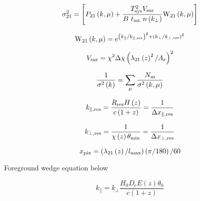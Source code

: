 \lipsum[1-1]

\begin{equation}
\sigma_{21}^2 = \left[ P_{21}\left(k, \mu \right) + \frac{T^2_{\rm sys} V_{\rm sur}}{B \ t_{\rm int} \ n \left(k_{\perp}\right)} {\rm W}_{21}\left(k, \mu \right) \right]
\end{equation}

\lipsum[2-4]

\begin{equation}
{\rm W}_{21}\left(k, \mu \right) = e^{\left(k_{\parallel} / k_{\parallel, \rm res} \right)^2 + \left(k_{\perp} / k_{\perp, \rm res} \right)^2}
\end{equation}

\begin{equation}
V_{\rm sur} = \chi^2 \Delta \chi \left( \lambda_{21} \left( z \right)^2 / A_e\right)^2
\end{equation}

\lipsum[2-4]

\begin{equation}
\frac{1}{\sigma^2 \left( k \right)} = \sum_{\mu} \frac{N_{\rm m}}{\sigma^2 \left( k, \mu \right)}
\end{equation}

\begin{equation}
k_{\parallel, \rm res} = \frac{R_{\rm res} H \left( z\right)}{c \left(1 + z\right)} = \frac{1}{\Delta x_{\parallel, \rm res}}
\end{equation}

\lipsum[2-4]

\begin{equation}
k_{\perp, \rm res} = \frac{1}{\chi \left( z \right) \theta_{\rm min}} = \frac{1}{\Delta x_{\perp, \rm res}}
\end{equation}

\lipsum[2-4]

\begin{equation}
x_{\rm pix} = \left( \lambda_{21} \left( z \right) / l_{\rm max}\right) \left( \pi / 180 \right) / 60
\end{equation}

Foreground wedge equation below

\begin{equation}
k_{\parallel} = k_{\perp} \frac{H_0 D_c E \left( z \right) \theta_0}{c \left( 1 + z \right)}
\end{equation}
